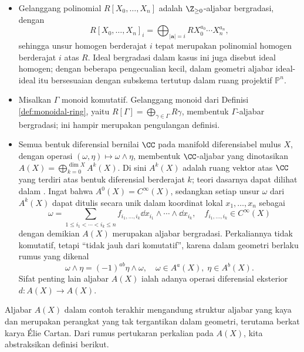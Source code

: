 \begin{itemize}
	\item Gelanggang polinomial $R[X_0, \ldots, X_n]$ adalah $\Z_{\geq 0}$-aljabar bergradasi, dengan
		\[ R[X_0, \ldots, X_n]_i = \bigoplus_{|\bm{a}|=i} R X_0^{a_0}  \cdots X_n^{a_n}, \]
		sehingga unsur homogen berderajat $i$ tepat merupakan polinomial homogen berderajat $i$ atas $R$. Ideal bergradasi dalam kasus ini juga disebut ideal homogen; dengan beberapa pengecualian kecil, dalam geometri aljabar ideal-ideal itu bersesuaian dengan subskema tertutup dalam ruang projektif $\mathbb{P}^n$.
	\item Misalkan $\Gamma$ monoid komutatif. Gelanggang monoid dari Definisi \ref{def:monoidal-ring}, yaitu $R[\Gamma] = \bigoplus_{\gamma \in \Gamma} R\gamma$, membentuk $\Gamma$-aljabar bergradasi; ini hampir merupakan pengulangan definisi.
	\item Semua bentuk diferensial bernilai $\CC$ pada manifold diferensiabel mulus $X$, dengan operasi $(\omega, \eta) \mapsto \omega \wedge \eta$, membentuk $\CC$-aljabar yang dinotasikan $A(X) = \bigoplus_{k=0}^{\dim X} A^k(X)$. Di sini $A^k(X)$ adalah ruang vektor atas $\CC$ yang terdiri atas bentuk diferensial berderajat $k$; teori dasarnya dapat dilihat dalam \cite[\S 3.2]{ChCh}. Ingat bahwa $A^0(X) = C^\infty(X)$, sedangkan setiap unsur $\omega$ dari $A^k(X)$ dapat ditulis secara unik dalam koordinat lokal $x_1, \ldots, x_n$ sebagai
	\[ \omega = \sum_{1 \leq i_1 < \cdots < i_k \leq n} f_{i_1, \ldots, i_k} \dd x_{i_1} \wedge \cdots \wedge \dd x_{i_k}, \quad f_{i_1, \ldots, i_k} \in C^\infty(X) \]
	dengan demikian $A(X)$ merupakan aljabar bergradasi. Perkaliannya tidak komutatif, tetapi ``tidak jauh dari komutatif'', karena dalam geometri berlaku rumus yang dikenal
	\[  \omega \wedge \eta = (-1)^{ab} \eta \wedge \omega, \quad \omega \in A^a(X), \; \eta \in A^b(X). \]
	Sifat penting lain aljabar $A(X)$ ialah adanya operasi diferensial eksterior $d: A(X) \to A(X)$.
\end{itemize}
Aljabar $A(X)$ dalam contoh terakhir mengandung struktur aljabar yang kaya dan merupakan perangkat yang tak tergantikan dalam geometri, terutama berkat karya Élie Cartan. Dari rumus pertukaran perkalian pada $A(X)$, kita abstraksikan definisi berikut.

